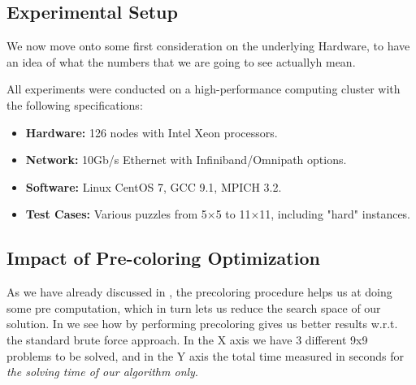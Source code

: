 
\subsection{Experimental Setup}
We now move onto some first consideration on the underlying Hardware, to have an idea of what the numbers that we are going to see actuallyh mean.

All experiments were conducted on a high-performance computing cluster with the following specifications:
\begin{itemize}
    \item \textbf{Hardware:} 126 nodes with Intel Xeon processors.
    \item \textbf{Network:} 10Gb/s Ethernet with Infiniband/Omnipath options.
    \item \textbf{Software:} Linux CentOS 7, GCC 9.1, MPICH 3.2.
    \item \textbf{Test Cases:} Various puzzles from 5×5 to 11×11, including "hard" instances.
\end{itemize}

\subsection{Impact of Pre-coloring Optimization}
\label{subsec:precoloring_performance}
As we have already discussed in , the precoloring procedure helps us at doing some pre computation, which in turn lets us reduce the search space of our solution. In  we see how by performing precoloring gives us better results w.r.t. the standard brute force approach. In the X axis we have 3 different 9x9 problems to be solved, and in the Y axis the total time measured in seconds for \textit{the solving time of our algorithm only}.

